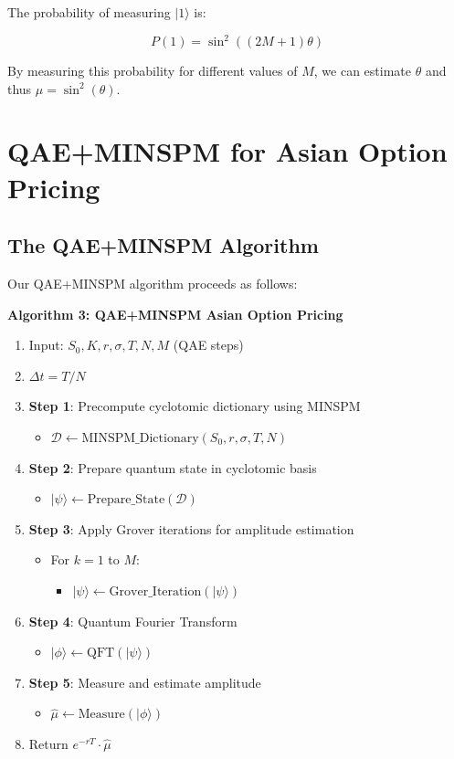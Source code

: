 \documentclass[12pt]{article}
\begin{document}
The probability of measuring $|1\rangle$ is:

\begin{equation}
P(1) = \sin^2((2M+1)\theta)
\end{equation}

By measuring this probability for different values of $M$, we can estimate $\theta$ and thus $\mu = \sin^2(\theta)$.

\section{QAE+MINSPM for Asian Option Pricing}

\subsection{The QAE+MINSPM Algorithm}

Our QAE+MINSPM algorithm proceeds as follows:

\textbf{Algorithm 3: QAE+MINSPM Asian Option Pricing}

\begin{enumerate}
    \item Input: $S_0, K, r, \sigma, T, N, M$ (QAE steps)
    \item $\Delta t = T/N$
    \item \textbf{Step 1}: Precompute cyclotomic dictionary using MINSPM
    \begin{itemize}
        \item $\mathcal{D} \gets \text{MINSPM\_Dictionary}(S_0, r, \sigma, T, N)$
    \end{itemize}
    \item \textbf{Step 2}: Prepare quantum state in cyclotomic basis
    \begin{itemize}
        \item $| \psi \rangle \gets \text{Prepare\_State}(\mathcal{D})$
    \end{itemize}
    \item \textbf{Step 3}: Apply Grover iterations for amplitude estimation
    \begin{itemize}
        \item For $k = 1$ to $M$:
        \begin{itemize}
            \item $| \psi \rangle \gets \text{Grover\_Iteration}(| \psi \rangle)$
        \end{itemize}
    \end{itemize}
    \item \textbf{Step 4}: Quantum Fourier Transform
    \begin{itemize}
        \item $| \phi \rangle \gets \text{QFT}(| \psi \rangle)$
    \end{itemize}
    \item \textbf{Step 5}: Measure and estimate amplitude
    \begin{itemize}
        \item $\hat{\mu} \gets \text{Measure}(| \phi \rangle)$
    \end{itemize}
    \item Return $e^{-rT} \cdot \hat{\mu}$
\end{enumerate}
\end{document}
